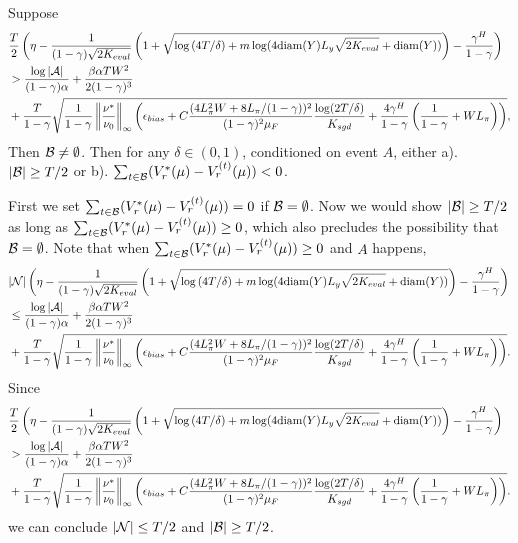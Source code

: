 \begin{lemma}\label{Lemma_well_define_B}
    Suppose 
    $$\begin{aligned}
        &\frac{T}{2}\left(\eta-\frac{1}{(1-\gamma)\sqrt{2K_{eval}}}\left(1+\sqrt{\log{(4T/\delta)}+m\log(4\mathrm{diam}(Y)L_y\sqrt{2K_{eval}}+\mathrm{diam}(Y))}\right)-\frac{\gamma^H}{1-\gamma}\right)\\
        &>\frac{\log|{\mathcal{A}}|}{(1-\gamma)\alpha}+\frac{\beta\alpha TW^2}{2(1-\gamma)^3}\\
        &+\frac{ T}{1-\gamma}\sqrt{\frac{1}{1-\gamma}\left\|\frac{\nu^*}{\nu_0}\right\|_\infty\left(\epsilon_{bias}+C\frac{(4L_\pi^2W+8L_\pi/(1-\gamma))^2}{(1-\gamma)^2\mu_F}\frac{\log(2T/\delta)}{K_{sgd}}+\frac{4\gamma^H}{1-\gamma}\left(\frac{1}{1-\gamma}+WL_\pi\right)\right)},
    \end{aligned}
    $$
Then ${\mathcal{B}}\not=\emptyset$. Then for any $\delta\in(0,1)$, conditioned on event $A$, either a). $|{\mathcal{B}}|\geq T/2$ or b). $\sum_{t\in{\mathcal{B}}}(V_r^*(\mu)-V_r^{(t)}(\mu))< 0$.
\end{lemma}
    First we set $\sum_{t\in{\mathcal{B}}}(V_r^*(\mu)-V_r^{(t)}(\mu))= 0$ if ${\mathcal{B}}=\emptyset$. Now we would show $|{\mathcal{B}}|\geq T/2$ as long as $\sum_{t\in{\mathcal{B}}}(V_r^*(\mu)-V_r^{(t)}(\mu))\geq 0$, which also precludes the possibility that ${\mathcal{B}}=\emptyset$.
    Note that when $\sum_{t\in{\mathcal{B}}}(V_r^*(\mu)-V_r^{(t)}(\mu))\geq 0$ and $A$ happens,
    $$
    \begin{aligned}
    &|{\mathcal{N}}|\left(\eta-\frac{1}{(1-\gamma)\sqrt{2K_{eval}}}\left(1+\sqrt{\log{(4T/\delta)}+m\log(4\mathrm{diam}(Y)L_y\sqrt{2K_{eval}}+\mathrm{diam}(Y))}\right)-\frac{\gamma^H}{1-\gamma}\right)\\
    &\leq\frac{\log|{\mathcal{A}}|}{(1-\gamma)\alpha}+\frac{\beta\alpha TW^2}{2(1-\gamma)^3}\\
    &+\frac{ T}{1-\gamma}\sqrt{\frac{1}{1-\gamma}\left\|\frac{\nu^*}{\nu_0}\right\|_\infty\left(\epsilon_{bias}+C\frac{(4L_\pi^2W+8L_\pi/(1-\gamma))^2}{(1-\gamma)^2\mu_F}\frac{\log(2T/\delta)}{K_{sgd}}+\frac{4\gamma^H}{1-\gamma}\left(\frac{1}{1-\gamma}+WL_\pi\right)\right)}.
    \end{aligned}
    $$
    Since
    $$
    \begin{aligned}
    &\frac{T}{2}\left(\eta-\frac{1}{(1-\gamma)\sqrt{2K_{eval}}}\left(1+\sqrt{\log{(4T/\delta)}+m\log(4\mathrm{diam}(Y)L_y\sqrt{2K_{eval}}+\mathrm{diam}(Y))}\right)-\frac{\gamma^H}{1-\gamma}\right)\\
    &>\frac{\log|{\mathcal{A}}|}{(1-\gamma)\alpha}+\frac{\beta\alpha TW^2}{2(1-\gamma)^3}\\
    &+\frac{ T}{1-\gamma}\sqrt{\frac{1}{1-\gamma}\left\|\frac{\nu^*}{\nu_0}\right\|_\infty\left(\epsilon_{bias}+C\frac{(4L_\pi^2W+8L_\pi/(1-\gamma))^2}{(1-\gamma)^2\mu_F}\frac{\log(2T/\delta)}{K_{sgd}}+\frac{4\gamma^H}{1-\gamma}\left(\frac{1}{1-\gamma}+WL_\pi\right)\right)}.
    \end{aligned}
    $$ we can conclude $|{\mathcal{N}}|\leq T/2$ and $|{\mathcal{B}}|\geq T/2$.
\endproof

